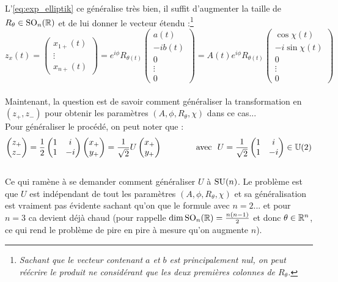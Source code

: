 L'\cref{eq:exp_elliptik} ce généralise  très bien, il suffit d'augmenter la taille de $R_\theta\in\text{SO}_n(\mathbb{R})$ et de lui donner le vecteur étendu :\footnote{\textit{Sachant que le vecteur contenant $a$ et $b$ est principalement nul, on peut réécrire le produit ne considérant que les deux premières colonnes de $R_\theta$.}}
\[z_x(t) = \begin{pmatrix}x_{1+}(t) \\ \vdots \\ 
	x_{n+}(t)\end{pmatrix} = e^{i\phi} R_{\theta(t)}\begin{pmatrix} a(t) \\ -ib(t) \\ 0 \\ \vdots \\ 0 \end{pmatrix} = A(t)e^{i\phi} R_{\theta(t)} \begin{pmatrix} \cos\chi(t) \\ -i\sin\chi(t) \\ 0 \\ \vdots \\ 0 \end{pmatrix}\]
\\

Maintenant, la question est de savoir comment généraliser la transformation en $(z_+, z_-)$ pour obtenir les paramètres $(A, \phi, R_\theta, \chi)$ dans ce cas...
\\
Pour généraliser le procédé, on peut noter que :
\[\begin{pmatrix}z_+ \\ z_-\end{pmatrix} = \frac{1}{2}\begin{pmatrix}1 & i \\ 1 & -i\end{pmatrix} \begin{pmatrix}x_+ \\ y_+\end{pmatrix} = \frac{1}{\sqrt{2}}U \begin{pmatrix}x_+ \\ y_+\end{pmatrix}\qquad\qquad \text{avec }\ U=\frac{1}{\sqrt{2}}\begin{pmatrix}1 & i \\ 1 & -i\end{pmatrix}\in\U(2)\]
\\ 
Ce qui ramène à se demander comment généraliser $U$ à $\text{SU}(n)$. Le problème est que $U$ est indépendant de tout les paramètres $(A, \phi, R_\theta, \chi)$ et sa généralisation est vraiment pas évidente sachant qu'on que le formule avec $n=2$... et pour $n=3$ ca devient déjà chaud (pour rappelle $\dim \text{SO}_n(\mathbb{R})=\frac{n(n-1)}{2}$ et donc $\theta\in\mathbb{R}^n$, ce qui rend le problème de pire en pire à mesure qu'on augmente $n$).



